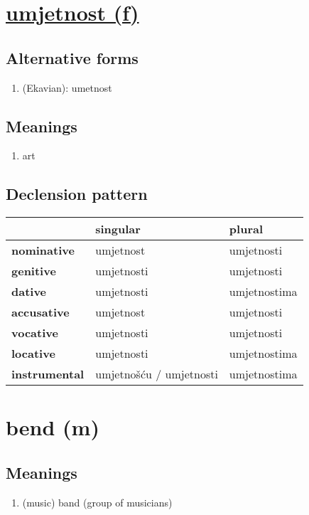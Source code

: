 \filbreak
\section{\underline{umjetnost (f)}}
\subsection*{Alternative forms}
\begin{enumerate}
\item (Ekavian): umetnost
\end{enumerate}
\subsection*{Meanings}
\begin{enumerate}
\item art
\end{enumerate}
\subsection*{Declension pattern}
\begin{tabularx}{\linewidth}{Xll}
\toprule
{} &                 singular &        plural \\
\midrule
\textbf{nominative  } &                umjetnost &    umjetnosti \\
\textbf{genitive    } &               umjetnosti &    umjetnosti \\
\textbf{dative      } &               umjetnosti &  umjetnostima \\
\textbf{accusative  } &                umjetnost &    umjetnosti \\
\textbf{vocative    } &               umjetnosti &    umjetnosti \\
\textbf{locative    } &               umjetnosti &  umjetnostima \\
\textbf{instrumental} &  umjetnošću / umjetnosti &  umjetnostima \\
\bottomrule
\end{tabularx}

\filbreak
\section{bend (m)}
\subsection*{Meanings}
\begin{enumerate}
\item (music) band (group of musicians)
\end{enumerate}
